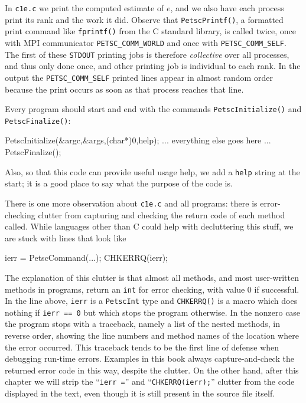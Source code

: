 In \texttt{c1e.c} we print the computed estimate of $e$, and we also have each process print its rank and the work it did.  Observe that \texttt{PetscPrintf()}, a formatted print command like \texttt{fprintf()} from the C standard library, is called twice, once with MPI communicator \texttt{PETSC\_COMM\_WORLD} and once with \texttt{PETSC\_COMM\_SELF}.  The first of these \texttt{STDOUT} printing jobs is therefore \emph{collective} over all processes, and thus only done once, and other printing job is individual to each rank.  In the output the \texttt{PETSC\_COMM\_SELF} printed lines appear in almost random order because the print occurs as soon as that process reaches that line.

Every \PETSc program should start and end with the commands \texttt{PetscInitialize()} and \texttt{PetscFinalize()}:
\begin{code}
PetscInitialize(&argc,&args,(char*)0,help);
... everything else goes here ...
PetscFinalize();
\end{code}
Also, so that this \PETSc code can provide useful usage help, we add a \texttt{help} string at the start; it is a good place to say what the purpose of the code is.

There is one more observation about \texttt{c1e.c} and all \PETSc programs: there is error-checking clutter from capturing and checking the return code of each method called.  While languages other than C could help with decluttering this stuff, we are stuck with lines that look like
\begin{code}
ierr = PetscCommand(...); CHKERRQ(ierr);
\end{code}
The explanation of this clutter is that almost all \PETSc methods, and most user-written methods in \PETSc programs, return an \texttt{int} for error checking, with value $0$ if successful.  In the line above, \texttt{ierr} is a \texttt{PetscInt} type and \texttt{CHKERRQ()} is a macro which does nothing if \texttt{ierr == 0} but which stops the program otherwise.  In the nonzero case the program stops with a traceback, namely a list of the nested methods, in reverse order, showing the line numbers and method names of the location where the error occurred.  This traceback tends to be the first line of defense when debugging run-time errors.  Examples in this book always capture-and-check the returned error code in this way, despite the clutter.  On the other hand, after this chapter we will strip the ``\texttt{ierr =}'' and ``\texttt{CHKERRQ(ierr);}'' clutter from the code displayed in the text, even though it is still present in the source file itself.


